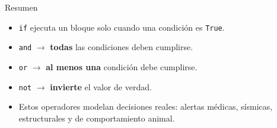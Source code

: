 \documentclass{beamer}
\begin{document}
    \begin{frame}{Resumen}
        \begin{itemize}
            \item \texttt{if} ejecuta un bloque solo cuando una
                  condición es \texttt{True}.
            \item \texttt{and} $\rightarrow$ \textbf{todas} las
                  condiciones deben cumplirse.
            \item \texttt{or} $\rightarrow$ \textbf{al menos una}
                  condición debe cumplirse.
            \item \texttt{not} $\rightarrow$ \textbf{invierte} el
                  valor de verdad.
            \item Estos operadores modelan decisiones reales: alertas
                  médicas, sísmicas, estructurales y de comportamiento
                  animal.
        \end{itemize}
    \end{frame}
    
\end{document}
